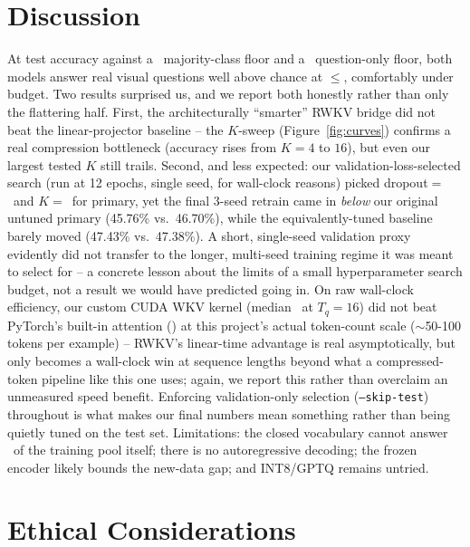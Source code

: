 \documentclass[final]{article}
\begin{document}
\section*{Discussion}

At \textbf{\primaryTestAcc} test accuracy against a \majorityFloor\ majority-class floor and a
\blindFloor\ question-only floor, both models answer real visual questions well above chance at
$\le$\primaryTotalSize, comfortably under budget. Two results surprised us, and we report both
honestly rather than only the flattering half. First, the architecturally ``smarter'' RWKV bridge
did not beat the linear-projector baseline -- the $K$-sweep (Figure~\ref{fig:curves}) confirms a
real compression bottleneck (accuracy rises from $K{=}4$ to $16$), but even our largest tested $K$
still trails. Second, and less expected: our validation-loss-selected search (run at 12 epochs,
single seed, for wall-clock reasons) picked dropout$=$\primaryTunedDropout\ and $K{=}$\primaryTunedK\
for primary, yet the final 3-seed retrain came in \emph{below} our original untuned primary
(45.76\% vs.\ 46.70\%), while the equivalently-tuned baseline barely moved (47.43\% vs.\ 47.38\%).
A short, single-seed validation proxy evidently did not transfer to the longer, multi-seed training
regime it was meant to select for -- a concrete lesson about the limits of a small hyperparameter
search budget, not a result we would have predicted going in. On raw wall-clock efficiency, our
custom CUDA WKV kernel (median \primaryLatencyMs\ at $T_q{=}16$) did not beat PyTorch's built-in
attention (\baselineLatencyMs) at this project's actual token-count scale ($\sim$50-100 tokens per
example) -- RWKV's linear-time advantage is real asymptotically, but only becomes a wall-clock win
at sequence lengths beyond what a compressed-token pipeline like this one uses; again, we report
this rather than overclaim an unmeasured speed benefit. Enforcing validation-only selection
(\texttt{--skip-test}) throughout is what makes our final numbers mean something rather than being
quietly tuned on the test set. Limitations: the closed vocabulary cannot answer \vocabCoverage\ of the training pool itself; there
is no autoregressive decoding; the frozen encoder likely bounds the new-data gap; and INT8/GPTQ
remains untried.

\section*{Ethical Considerations}
\end{document}
